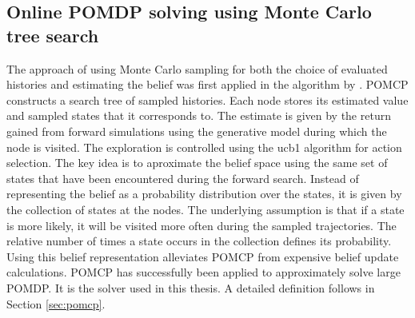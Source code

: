\subsection{Online POMDP solving using Monte Carlo tree search}

The approach of using Monte Carlo sampling for both the choice of evaluated histories and estimating the belief was first applied in the  algorithm by \cite{pomcp}. POMCP constructs a search tree of sampled histories. Each node stores its estimated value and sampled states that it corresponds to. The estimate is given by the return gained from forward simulations using the generative model during which the node is visited. The exploration is controlled using the \gls{ucb1} \parencite{ucb1} algorithm for action selection. The key idea is to aproximate the belief space using the same set of states that have been encountered during the forward search. Instead of representing the belief as a probability distribution over the states, it is given by the collection of states at the nodes. The underlying assumption is that if a state is more likely, it will be visited more often during the sampled trajectories. The relative number of times a state occurs in the collection defines its probability. Using this belief representation alleviates POMCP from expensive belief update calculations. POMCP has successfully been applied to approximately solve large POMDP. It is the solver used in this thesis. A detailed definition follows in Section \ref{sec:pomcp}. 

